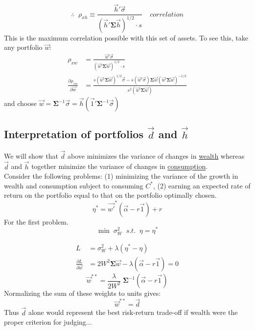 \documentclass[
14pt,notheorems,hyperref={pdfauthor=whatever}
]{beamer}
\begin{document}
\begin{frame}
\begin{equation} \tag{18}
    \therefore \;\; \rho_{xh} \equiv \frac{\vec{h}'\vec\sigma}{(\vec{h}'\bm{\Sigma}\vec{h})^{1/2}\cdot s} \;\;\;\; \textit{correlation}
\end{equation}
This is the maximum correlation possible with this set of assets. To see this, take any portfolio $\vec{w}$:\\
\begin{align*}
    \rho_{xw} &= \frac{\vec{w}'\vec\sigma}{(\vec{w}'\bm{\Sigma}\vec{w})^{1/2}\cdot s}\\
    \frac{\partial \rho_{xw}}{\partial \vec{w}} &= \frac{s(\vec{w}'\bm{\Sigma}\vec{w})^{1/2}\vec\sigma-s(\vec{w}'\vec\sigma)\bm{\Sigma}\vec{w}(\vec{w}'\bm{\Sigma}\vec{w})^{-1/2}}{s^2(\vec{w}'\bm{\Sigma}\vec{w})}
\end{align*}
and choose $\vec{w} = \bm{\Sigma}^{-1}\vec\sigma = \vec{h}(\vec1'\bm{\Sigma}^{-1}\vec \sigma)$
\end{frame}

\subsection{Interpretation of portfolios $\vec{d}$ and $\vec{h}$}
\begin{frame}
We will show that $\vec{d}$ above minimizes the variance of changes in \underline{wealth} whereas $\vec{d}$ and $\vec{h}$ together minimize the variance of changes in \underline{consumption}.\\
\hfill\break
Consider the following problems: (1) minimizing the variance of the growth in wealth and consumption subject to consuming $C^*$, (2) earning an expected rate of return on the portfolio equal to that on the portfolio optimally chosen.\\
\[ \eta^* = \vec{w'}^{*} (\vec{\alpha}-r\vec{1})+r \]
For the first problem.\\
\[ \min \;\sigma_W^2 \;\;\textit{s.t.}\;\; \eta=\eta^* \]
\end{frame}

\begin{frame}
\begin{align*}
    L &= \sigma_W^2 + \lambda(\eta^* - \eta)\\
    \frac{\partial L}{\partial \vec{w}} &= 2W^2\bm{\Sigma}\vec{w} - \lambda(\vec\alpha-r\vec1) = 0
\end{align*}
\[ \vec{w}^{**} = \frac{\lambda}{2W^2}\;\bm{\Sigma}^{-1}(\vec\alpha-r\vec1 )\]
Normalizing the sum of these weights to units gives:\\
\[ \vec{w}^{**} = \vec{d} \]
Thus $\vec{d}$ alone would represent the best risk-return trade-off if wealth were the proper criterion for judging...
\end{frame}
\end{document}
